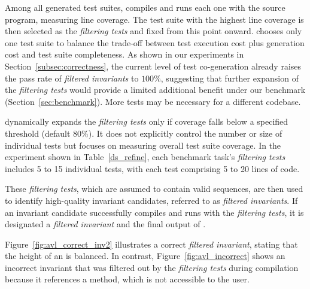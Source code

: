 Among all generated test suites, \tech compiles and runs each one with the source program, measuring line coverage. The test suite with the highest line coverage is then selected as the \textit{filtering tests} and fixed from this point onward. \tech chooses only one test suite to balance the trade-off between test execution cost plus generation cost  and test suite completeness. 
As shown in our experiments in Section~\ref{subsec:correctness}, the current level of test co-generation already raises the pass rate of \textit{filtered invariants} to $100\%$, suggesting that further expansion of the \textit{filtering tests} would provide a limited additional benefit under our benchmark (Section~\ref{sec:benchmark}). More tests may be necessary for a different codebase.

\tech dynamically expands the \textit{filtering tests} only if coverage falls below a specified threshold (default $80\%$). It does not explicitly control the number or size of individual tests but focuses on measuring overall test suite coverage. In the experiment shown in Table~\ref{ds_refine}, each benchmark task’s \textit{filtering tests} includes 5 to 15 individual tests, with each test comprising 5 to 20 lines of code.

These \textit{filtering tests}, which are assumed to contain valid sequences, are then used to identify high-quality invariant candidates, referred to as \textit{filtered invariants}. If an invariant candidate successfully compiles and runs with the \textit{filtering tests}, it is designated a \textit{filtered invariant} and the final output of \tech.


Figure~\ref{fig:avl_correct_inv2} illustrates a correct \textit{filtered invariant}, stating that the height of an  is balanced. In contrast, Figure~\ref{fig:avl_incorrect} shows an incorrect invariant that was filtered out by the \textit{filtering tests} during compilation because it references a  method, which is not accessible to the user.

